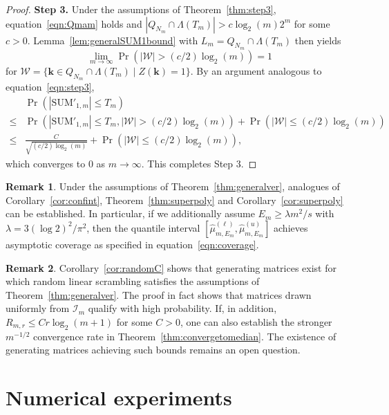 \documentclass{article}
\theoremstyle{definition}
\newtheorem{remark}{Remark}
\renewcommand{\le}{\leqslant}
\renewcommand{\leq}{\leqslant}
\renewcommand{\geq}{\geqslant}
\newcommand{\bsk}{\boldsymbol{k}}
\begin{document}
\begin{proof}
\textbf{Step 3.}  Under the assumptions of Theorem~\ref{thm:step3}, equation~\eqref{eqn:Qmam} holds and $|Q_{N_m}\cap \Lambda(T_m)|>c\log_2(m)2^m$ for some $c>0$. Lemma~\ref{lem:generalSUM1bound} with $L_m=Q_{N_m}\cap \Lambda(T_m)$ then yields
$$\lim_{m\to\infty}\Pr(|\mathcal{W}|>(c/2)\log_2(m))=1$$
for $\mathcal{W}=\{\bsk\in Q_{N_m}\cap \Lambda(T_m)\mid Z(\bsk)=1\}$. By an argument analogous to equation~\eqref{eqn:step3},
\begin{align*}
    &\Pr\left(|\mathrm{SUM}'_{1,m}|\le T_m\right)\\
    \leq & \Pr\left(|\mathrm{SUM}'_{1,m}|\le T_m,|\mathcal{W}|> (c/2)\log_2(m)\right) +\Pr\left(|\mathcal{W}|\leq (c/2)\log_2(m)\right)\\
    \leq & \frac{C}{\sqrt{(c/2)\log_2(m)}}+\Pr\left(|\mathcal{W}|\leq (c/2)\log_2(m)\right),
\end{align*}
which converges to $0$ as $m\to\infty$. This completes Step 3.
\end{proof}

\begin{remark}
Under the assumptions of Theorem~\ref{thm:generalver}, analogues of Corollary~\ref{cor:confint}, Theorem~\ref{thm:superpoly} and Corollary~\ref{cor:superpoly} can be established. In particular, if we additionally assume $E_m\geq \lambda m^2/s$ with $\lambda=3(\log 2)^2/\pi^2$, then the quantile interval $[\hat{\mu}^{(\ell)}_{m,E_m},\hat{\mu}^{(u)}_{m,E_m}]$ achieves asymptotic coverage as specified in equation~\eqref{eqn:coverage}.
\end{remark}


\begin{remark}
Corollary~\ref{cor:randomC} shows that generating matrices exist for which random linear scrambling satisfies the assumptions of Theorem~\ref{thm:generalver}. The proof in fact shows that matrices drawn uniformly from $\mathcal{I}_m$ qualify with high probability. If, in addition, $R_{m,r}\leq Cr\log_2(m+1)$ for some $C>0$, one can also establish the stronger $m^{-1/2}$ convergence rate in Theorem~\ref{thm:convergetomedian}. The existence of generating matrices achieving such bounds remains an open question.
\end{remark}




\section{Numerical experiments}\label{sec:experiment}
\end{document}
